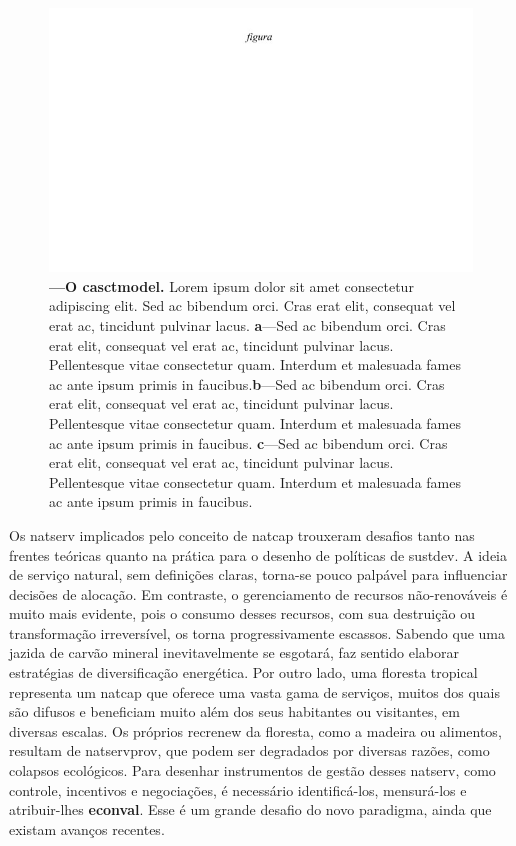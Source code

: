 \documentclass[./main.tex]{subfiles}
\begin{document}
\begin{figure}[t!] 
\centering				
\includegraphics[width=0.98\linewidth]{figs/fig_m.jpg}		
\caption[O \gls{model} de cascata de serviços naturais]
{\textbf{---\;O \gls{casctmodel}.}
    Lorem ipsum dolor sit amet consectetur adipiscing elit. Sed ac bibendum orci. Cras erat elit, consequat vel erat ac, tincidunt pulvinar lacus. \;\textbf{a}\;---\;Sed ac bibendum orci. Cras erat elit, consequat vel erat ac, tincidunt pulvinar lacus. Pellentesque vitae consectetur quam. Interdum et malesuada fames ac ante ipsum primis in faucibus.\;\textbf{b}\;---\;Sed ac bibendum orci. Cras erat elit, consequat vel erat ac, tincidunt pulvinar lacus. Pellentesque vitae consectetur quam. Interdum et malesuada fames ac ante ipsum primis in faucibus. \;\textbf{c}\;---\;Sed ac bibendum orci. Cras erat elit, consequat vel erat ac, tincidunt pulvinar lacus. Pellentesque vitae consectetur quam. Interdum et malesuada fames ac ante ipsum primis in faucibus.
}
\label{fig:eco:cascade} 		
\end{figure}

\par Os \gls{natserv} implicados pelo conceito de \gls{natcap} trouxeram desafios tanto nas frentes teóricas quanto na prática para o desenho de políticas de \gls{sustdev}. A ideia de serviço natural, sem definições claras, torna-se pouco palpável para influenciar decisões de alocação. Em contraste, o gerenciamento de recursos não-renováveis é muito mais evidente, pois o consumo desses recursos, com sua destruição ou transformação irreversível, os torna progressivamente escassos. Sabendo que uma jazida de carvão mineral inevitavelmente se esgotará, faz sentido elaborar estratégias de diversificação energética. Por outro lado, uma floresta tropical representa um \gls{natcap} que oferece uma vasta gama de serviços, muitos dos quais são difusos e beneficiam muito além dos seus habitantes ou visitantes, em diversas escalas. Os próprios \gls{recrenew} da floresta, como a madeira ou alimentos, resultam de \gls{natservprov}, que podem ser degradados por diversas razões, como colapsos ecológicos. Para desenhar instrumentos de gestão desses \gls{natserv}, como controle, incentivos e negociações, é necessário identificá-los, mensurá-los e atribuir-lhes \textbf{\gls{econval}}. Esse é um grande desafio do novo \gls{paradigma}, ainda que existam avanços recentes.
\end{document}

